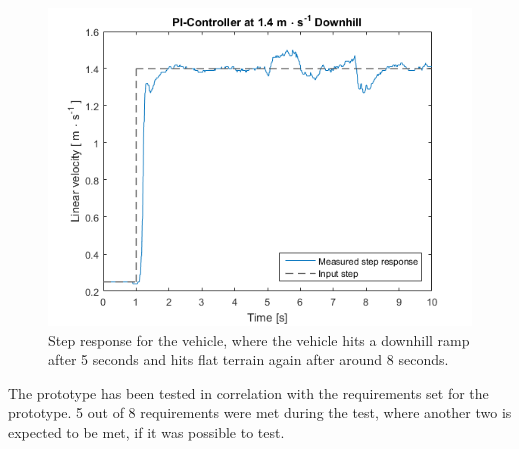 \begin{figure}[H]
  \centering
	\includegraphics[scale=0.8]{figures/AccTest8D.png}
	\caption{Step response for the vehicle, where the vehicle hits a downhill ramp after 5 seconds and hits flat terrain again after around 8 seconds.}
	\label{AccT8Dfig}
\end{figure}\vspace{-5mm}

The prototype has been tested in correlation with the requirements set for the prototype. 5 out
of 8 requirements were met during the test, where another two is expected to be met, if it was possible to test.